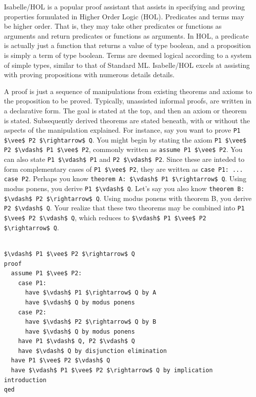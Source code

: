 \documentclass[letterpaper, 11pt]{extarticle}
\begin{document}
Isabelle/HOL is a popular proof assistant that assists in specifying and proving properties
formulated in Higher Order Logic (HOL).  Predicates and terms may be higher order. That is, they
may take other predicates or functions as arguments and return predicates or functions as arguments. 
In HOL, a predicate is actually just a function that returns a value of type boolean, and a proposition
is simply a term of type boolean. Terms are deemed logical according to a system of simple types, similar to
that of Standard ML.  Isabelle/HOL excels at assisting with proving propositions with numerous details details. 

A proof is just a sequence of manipulations from existing theorems and axioms to the proposition to be proved.  
Typically, unassisted informal proofs, are written in a declarative form. The goal is stated at the top,
and then an axiom or theorem is stated. Subsequently derived theorems are stated beneath, with
or without the aspects of the manipulation explained.
For instance, say you want to prove \lstinline[mathescape]{P1 $\vee$ P2 $\rightarrow$ Q}.  You might begin by 
stating the axiom \lstinline[mathescape]{P1 $\vee$ P2 $\vdash$ P1 $\vee$ P2}, commonly written as \lstinline[language=logic]{assume P1 $\vee$ P2}.
You can also state \lstinline[mathescape]{P1 $\vdash$ P1} and \lstinline[mathescape]{P2 $\vdash$ P2}. Since
these are inteded to form complementary cases of \lstinline[mathescape]{P1 $\vee$ P2}, they are written as \lstinline[language=logic]{case P1: ... case P2}.
Perhaps you know \lstinline[language=logic]{theorem A: $\vdash$ P1 $\rightarrow$ Q}. Using modus ponens, you derive \lstinline[mathescape]{P1 $\vdash$ Q}. Let's say
you also know \lstinline[language=logic]{theorem B: $\vdash$ P2 $\rightarrow$ Q}. Using modus ponens with theorem B, you derive \lstinline[mathescape]{P2 $\vdash$ Q}.
Your realize that these two theorems may be combined into \lstinline[mathescape]{P1 $\vee$ P2 $\vdash$ Q}, which reduces to \lstinline[mathescape]{$\vdash$ P1 $\vee$ P2 $\rightarrow$ Q}.


\begin{lstlisting}[language=logic, mathescape]

$\vdash$ P1 $\vee$ P2 $\rightarrow$ Q
proof
  assume P1 $\vee$ P2:
    case P1:
      have $\vdash$ P1 $\rightarrow$ Q by A
      have $\vdash$ Q by modus ponens
    case P2:
      have $\vdash$ P2 $\rightarrow$ Q by B    
      have $\vdash$ Q by modus ponens
    have P1 $\vdash$ Q, P2 $\vdash$ Q
    have $\vdash$ Q by disjunction elimination
  have P1 $\vee$ P2 $\vdash$ Q
  have $\vdash$ P1 $\vee$ P2 $\rightarrow$ Q by implication introduction  
qed
  
\end{lstlisting}
\end{document}
